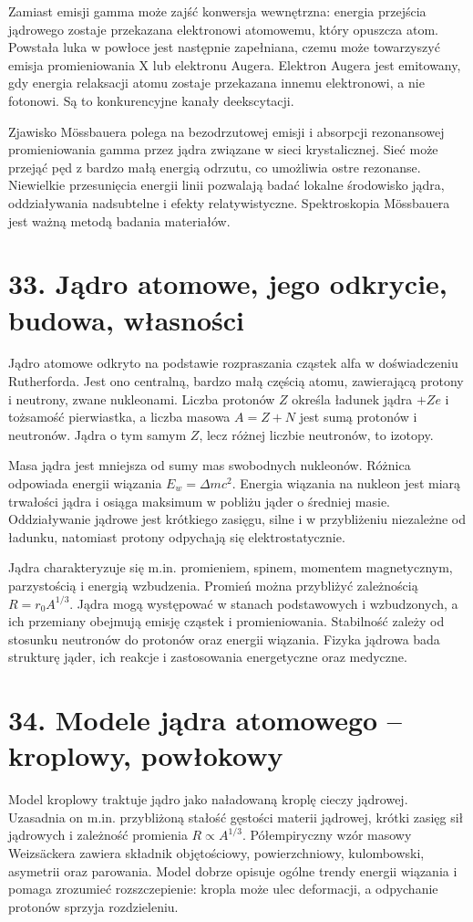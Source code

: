\documentclass[11pt,a4paper,oneside]{report}
\begin{document}
Zamiast emisji gamma może zajść konwersja wewnętrzna: energia przejścia jądrowego zostaje przekazana elektronowi atomowemu, który opuszcza atom. Powstała luka w powłoce jest następnie zapełniana, czemu może towarzyszyć emisja promieniowania X lub elektronu Augera. Elektron Augera jest emitowany, gdy energia relaksacji atomu zostaje przekazana innemu elektronowi, a nie fotonowi. Są to konkurencyjne kanały deekscytacji.

Zjawisko Mössbauera polega na bezodrzutowej emisji i absorpcji rezonansowej promieniowania gamma przez jądra związane w sieci krystalicznej. Sieć może przejąć pęd z bardzo małą energią odrzutu, co umożliwia ostre rezonanse. Niewielkie przesunięcia energii linii pozwalają badać lokalne środowisko jądra, oddziaływania nadsubtelne i efekty relatywistyczne. Spektroskopia Mössbauera jest ważną metodą badania materiałów.

\section{33. Jądro atomowe, jego odkrycie, budowa, własności}
Jądro atomowe odkryto na podstawie rozpraszania cząstek alfa w doświadczeniu Rutherforda. Jest ono centralną, bardzo małą częścią atomu, zawierającą protony i neutrony, zwane nukleonami. Liczba protonów \(Z\) określa ładunek jądra \(+Ze\) i tożsamość pierwiastka, a liczba masowa \(A=Z+N\) jest sumą protonów i neutronów. Jądra o tym samym \(Z\), lecz różnej liczbie neutronów, to izotopy.

Masa jądra jest mniejsza od sumy mas swobodnych nukleonów. Różnica odpowiada energii wiązania \(E_w=\Delta mc^2\). Energia wiązania na nukleon jest miarą trwałości jądra i osiąga maksimum w pobliżu jąder o średniej masie. Oddziaływanie jądrowe jest krótkiego zasięgu, silne i w przybliżeniu niezależne od ładunku, natomiast protony odpychają się elektrostatycznie.

Jądra charakteryzuje się m.in. promieniem, spinem, momentem magnetycznym, parzystością i energią wzbudzenia. Promień można przybliżyć zależnością \(R=r_0A^{1/3}\). Jądra mogą występować w stanach podstawowych i wzbudzonych, a ich przemiany obejmują emisję cząstek i promieniowania. Stabilność zależy od stosunku neutronów do protonów oraz energii wiązania. Fizyka jądrowa bada strukturę jąder, ich reakcje i zastosowania energetyczne oraz medyczne.

\section{34. Modele jądra atomowego – kroplowy, powłokowy}
Model kroplowy traktuje jądro jako naładowaną kroplę cieczy jądrowej. Uzasadnia on m.in. przybliżoną stałość gęstości materii jądrowej, krótki zasięg sił jądrowych i zależność promienia \(R\propto A^{1/3}\). Półempiryczny wzór masowy Weizsäckera zawiera składnik objętościowy, powierzchniowy, kulombowski, asymetrii oraz parowania. Model dobrze opisuje ogólne trendy energii wiązania i pomaga zrozumieć rozszczepienie: kropla może ulec deformacji, a odpychanie protonów sprzyja rozdzieleniu.
\end{document}
